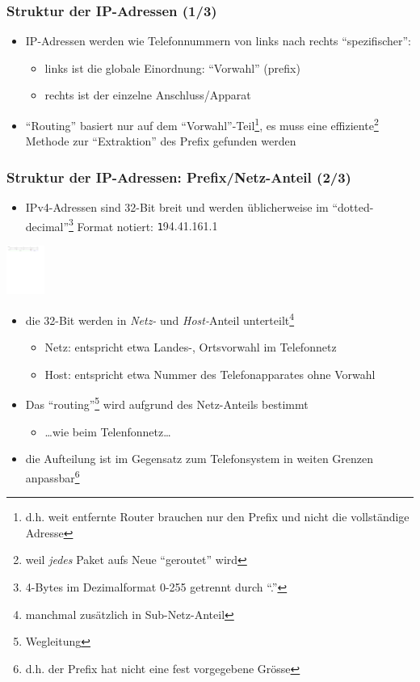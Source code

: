 \documentclass{beamer}
\begin{document}
\begin{frame}
\frametitle{Struktur der IP-Adressen (1/3)}
\begin{itemize}
  \item IP-Adressen werden wie Telefonnummern von links nach rechts ``spezifischer'':
  \begin{itemize}
    \item links ist die globale Einordnung: ``Vorwahl'' (prefix)
    \item rechts ist der einzelne Anschluss/Apparat
  \end{itemize}
  \item ``Routing'' basiert nur auf dem ``Vorwahl''-Teil\footnote{d.h. weit entfernte Router brauchen nur den Prefix und nicht die vollst\"andige Adresse}, es muss eine effiziente\footnote{weil {\em jedes} Paket aufs Neue ``geroutet'' wird} Methode zur ``Extraktion'' des Prefix gefunden werden
\end{itemize}
\end{frame}

\begin{frame}
\frametitle{Struktur der IP-Adressen: Prefix/Netz-Anteil (2/3)}
\begin{itemize}
	\item{IPv4-Adressen sind 32-Bit breit und werden \"ublicherweise im ``dotted-decimal''\footnote{4-Bytes im Dezimalformat 0-255 getrennt durch ``.''} Format notiert: {\texttt 194.41.161.1}}
\end{itemize}
  {\center \includegraphics[height=1.6cm]{ip-address}}
\begin{itemize}
	\item{die 32-Bit werden in {\em Netz-} und {\em Host-}Anteil unterteilt\footnote{manchmal zus\"atzlich in Sub-Netz-Anteil}}
	\begin{itemize}
	\item{{\tiny Netz: entspricht etwa Landes-, Ortsvorwahl im Telefonnetz}}
	\item{{\tiny Host: entspricht etwa Nummer des Telefonapparates ohne Vorwahl}}
  \end{itemize}
  \item{Das ``routing''\footnote{Wegleitung} wird aufgrund des Netz-Anteils bestimmt}
  \begin{itemize}
	\item{{\tiny \ldots wie beim Telenfonnetz\ldots}}
\end{itemize}
  \item die Aufteilung ist im Gegensatz zum Telefonsystem in weiten Grenzen anpassbar\footnote{d.h. der Prefix hat nicht eine fest vorgegebene Gr\"osse}
	\end{itemize}
\end{frame}
\end{document}
